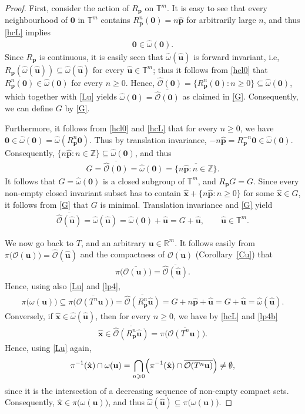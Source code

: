 \documentclass[11pt,reqno,tbtags,a4paper]{amsart}
\numberwithin{equation}{section}
\renewcommand\ge{\geq}
\renewcommand\geq{\geqslant}
\theoremstyle{plain}%
\theoremstyle{definition}
\theoremstyle{remark}
\newcommand{\refC}[1]{Corollary~\ref{#1}}
\newcommand\set[1]{\ensuremath{\{#1\}}}
\newcommand\xpar[1]{(#1)}
\newcommand\bigpar[1]{\bigl(#1\bigr)}
\newcommand\Bigpar[1]{\Bigl(#1\Bigr)}
\newcommand\punkt{\xperiod}    %
\newcommand\ie{i.e\punkt}
\newcommand\bbR{\mathbb R}
\newcommand\bbT{\mathbb T}
\newcommand\bbZ{\mathbb Z}
\newcommand\gO{\hat{\cO}}
\newcommand\cL{{\omega}}
\newcommand\hcL{\hat{\cL}}
\newcommand\cO{\mathcal O}
\newcommand\qw{^{-1}}
\newcommand\vp{\mathbf{p}}
\newcommand\hvp{\hat{\mathbf{p}}}
\newcommand\vu{\mathbf{u}}
\newcommand\hvu{{\hat{\mathbf{u}}}}
\newcommand\hvx{\hat{\mathbf{x}}}
\newcommand\Rp{R_\vp}
\newcommand\bcO[1]{\overline{\cO(#1)}}
\newcommand\bgO[1]{\overline{\gO(#1)}}
\newcommand\0{{\boldsymbol 0}}
\newcommand\1{{\boldsymbol 1}}
\begin{document}
\begin{proof}
First, consider the action of $\Rp$ on $\bbT^m$.
It is easy to see that every neighbourhood of $\0$ in $\bbT^m$ contains
$\Rp^n(\0)=n\hvp$ for arbitrarily large $n$, and thus 
\eqref{hcL} implies
\begin{align}
  \label{hcl0}
\0\in\hcL(\0).
\end{align}
Since $\Rp$ is continuous, it is easily seen that
$\hcL(\hvu)$ is forward invariant, \ie,
$\Rp(\hcL(\hvu))\subseteq\hcL(\hvu)$ for every $\hvu\in\bbT^m$;
thus it follows from \eqref{hcl0} that $\Rp^n(\0)\in\hcL(\0)$ for every $n\ge0$.
Hence, $\gO(\0)=\set{\Rp^n(\0):n\ge0}\subseteq\hcL(\0)$,
which together with \eqref{Lu} yields $\hcL(\0)=\bgO{\0}$
as claimed in \eqref{G}.
Consequently, we can define $G$ by \eqref{G}.

Furthermore, it follows from \eqref{hcl0} and \eqref{hcL} 
that for every $n\ge0$, we have
$\0\in\hcL(\0)=\hcL(\Rp^n\0)$. 
Thus by translation invariance,
$-n\hvp=\Rp^{-n}\0\in\hcL(\0)$.
Consequently, $\set{n\hvp:n\in\bbZ}\subseteq\hcL(\0)$, and thus
\begin{align}\label{lp3}
G=
\bgO{\0}=
  \hcL(\0)
=\overline{\set{n\hvp:n\in\bbZ}}.
\end{align}
It follows that $G=\hcL(\0)$ is a closed subgroup of $\bbT^m$, 
and $\Rp G = G$. Since every non-empty closed invariant subset has to contain
$\hvx+\set{n\hvp:n\ge0}$ for some $\hvx\in G$, 
it follows from \eqref{G} that $G$ is minimal.
%
Translation invariance and \eqref{G} yield
\begin{align}\label{lp4}
\bgO{\hvu}=
\hcL(\hvu)=\hcL(\0)+\hvu=G+\hvu,
\qquad \hvu\in\bbT^m.   
\end{align}

We now go back to $T$, and an arbitrary $\vu\in\bbR^m$.
%
It follows easily from 
$\pi\bigpar{\cO\xpar{\vu}}=\gO\xpar{\hvu}$ and
the compactness of $\bcO{\vu}$ (\refC{Cu}) that
\begin{align}\label{lp4b}
\pi\bigpar{\bcO{\vu}}=\bgO{\hvu}.  
\end{align}
Hence, using also \eqref{Lu} and \eqref{lp4},
\begin{align}\label{lp5}
\pi\bigpar{\cL(\vu)}\subseteq \pi\bigpar{\bcO{T^n\vu}}=\bgO{\Rp^n\hvu}
=G+n\hvp+\hvu=G+\hvu=\hcL(\hvu).  
\end{align}
Conversely, 
if $\hvx\in\hcL(\hvu)$, then for every $n\ge0$, we have by \eqref{hcL}
and \eqref{lp4b}
\begin{align}\label{lp6}
  \hvx\in \bgO{\Rp^n\hvu}=\pi\bigpar{\bcO{T^n\vu}}.
\end{align}
Hence, using \eqref{Lu} again,
\begin{align}
  \pi\qw(\hvx)\cap\cL(\vu)
=  \bigcap_{n\ge0}\Bigpar{\pi\qw(\hvx)\cap\bcO{T^n\vu}}
\neq\emptyset,
\end{align}
since it
is the intersection of a decreasing sequence of non-empty
compact sets. Consequently, $\hvx\in\pi\bigpar{\cL(\vu)}$, and thus
$\hcL(\hvu)\subseteq\pi\bigpar{\cL(\vu)}$.


\end{proof}
\end{document}
